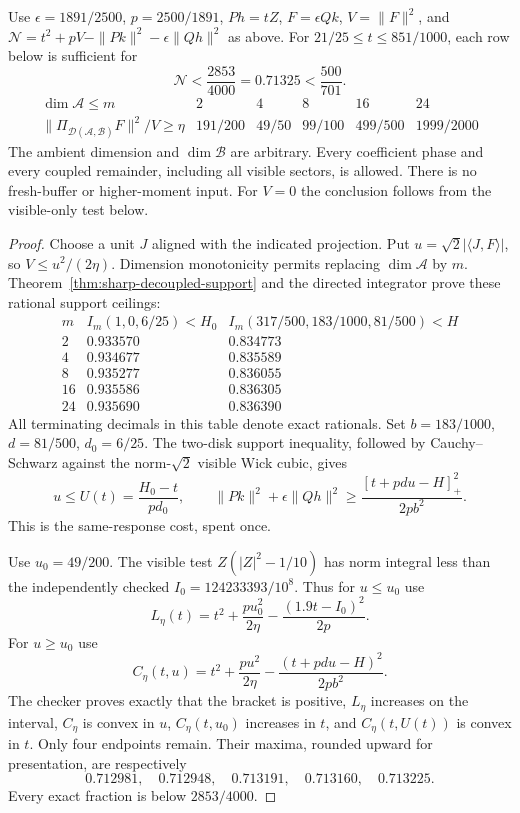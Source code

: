 \begin{theorem}
\label{thm:phase-preserving-contact}
Use $\epsilon=1891/2500$, $p=2500/1891$, $Ph=tZ$,
$F=\epsilon Qk$, $V=\|F\|^2$, and
$\mathcal N=t^2+pV-\|Pk\|^2-\epsilon\|Qh\|^2$ as above.
For $21/25\le t\le851/1000$, each row below is sufficient for
\[
 \boxed{\mathcal N<\frac{2853}{4000}=0.71325<\frac{500}{701}.}
\]
\[
\begin{array}{c|ccccc}
 \dim\mathcal A\le m&2&4&8&16&24\\\hline
 \|\Pi_{\mathcal D(\mathcal A,\mathcal B)}F\|^2/V\ge\eta
 &191/200&49/50&99/100&499/500&1999/2000
\end{array}
\]
The ambient dimension and $\dim\mathcal B$ are arbitrary. Every
coefficient phase and every coupled remainder, including all visible
sectors, is allowed. There is no fresh-buffer or higher-moment input.
For $V=0$ the conclusion follows from the visible-only test below.
\end{theorem}

\begin{proof}
Choose a unit $J$ aligned with the indicated projection. Put
$u=\sqrt2|\langle J,F\rangle|$, so $V\le u^2/(2\eta)$.
Dimension monotonicity permits replacing $\dim\mathcal A$ by $m$.
Theorem~\ref{thm:sharp-decoupled-support} and the directed integrator
prove these rational support ceilings:
\[
\begin{array}{c|c|c}
 m&I_m(1,0,6/25)<H_0&I_m(317/500,183/1000,81/500)<H\\\hline
 2&0.933570&0.834773\\
 4&0.934677&0.835589\\
 8&0.935277&0.836055\\
 16&0.935586&0.836305\\
 24&0.935690&0.836390
\end{array}
\]
All terminating decimals in this table denote exact rationals.
Set $b=183/1000$, $d=81/500$, $d_0=6/25$. The two-disk support
inequality, followed by Cauchy--Schwarz against the norm-$\sqrt2$
visible Wick cubic, gives
\[
 u\le U(t)=\frac{H_0-t}{pd_0},\qquad
 \|Pk\|^2+\epsilon\|Qh\|^2
    \ge\frac{[t+pdu-H]_+^2}{2pb^2}.
\]
This is the same-response cost, spent once.

Use $u_0=49/200$. The visible test $Z(|Z|^2-1/10)$ has norm integral
less than the independently checked $I_0=124233393/10^8$. Thus for
$u\le u_0$ use
\[
 L_\eta(t)=t^2+\frac{pu_0^2}{2\eta}
                    -\frac{(1.9t-I_0)^2}{2p}.
\]
For $u\ge u_0$ use
\[
 C_\eta(t,u)=t^2+\frac{pu^2}{2\eta}
                  -\frac{(t+pdu-H)^2}{2pb^2}.
\]
The checker proves exactly that the bracket is positive, $L_\eta$
increases on the interval, $C_\eta$ is convex in $u$,
$C_\eta(t,u_0)$ increases in $t$, and $C_\eta(t,U(t))$ is convex in
$t$. Only four endpoints remain. Their maxima, rounded upward for
presentation, are respectively
\[
 0.712981,\quad0.712948,\quad0.713191,\quad0.713160,\quad0.713225.
\]
Every exact fraction is below $2853/4000$.
\end{proof}

